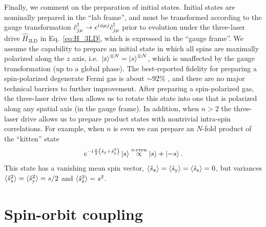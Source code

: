 \documentclass[aps,pra,nofootinbib,twocolumn,superscriptaddress]{revtex4-2}
\renewcommand{\t}{\text} %
\newcommand{\p}[1]{\left(#1\right)} %
\newcommand{\bk}{\braket} %
\renewcommand{\i}{\mathrm{i}\mkern1mu} %
\newcommand{\1}{\mathds{1}}
\renewcommand{\c}{\hat{c}}
\newcommand{\s}{\hat{s}}
\renewcommand{\H}{\hat{H}}
\newcommand{\x}{\text{x}}
\newcommand{\y}{\text{y}}
\newcommand{\z}{\text{z}}
\begin{document}
Finally, we comment on the preparation of initial states.
Initial states are nominally prepared in the ``lab frame'', and must be transformed according to the gauge transformation $\c_{j\mu}^\dag\to e^{\i\phi\mu j} \c_{j\mu}^\dag$ prior to evolution under the three-laser drive $\H_{\t{3LD}}$ in Eq.~\eqref{eq:H_3LD}, which is expressed in the ``gauge frame''.
We assume the capability to prepare an initial state in which all spins are maximally polarized along the $z$ axis, i.e.~$\ket{\z}^{\otimes N}=\ket{s}^{\otimes N}$, which is unaffected by the gauge transformation (up to a global phase).
The best-reported fidelity for preparing a spin-polarized degenerate Fermi gas is about $\sim92\%$ \cite{sonderhouse2020thermodynamics}, and there are no major technical barriers to further improvement.
After preparing a spin-polarized gas, the three-laser drive then allows us to rotate this state into one that is polarized along any spatial axis (in the gauge frame).
In addition, when $n>2$ the three-laser drive allows us to prepare product states with nontrivial intra-spin correlations.
For example, when $n$ is even we can prepare an $N$-fold product of the ``kitten'' state
\begin{align}
  e^{-\i\frac{\pi}{2}\p{\s_\y + \s_\y^2}} \ket{s}
  \stackrel{n\,\t{even}}{\propto} \ket{s} + \ket{-s}.
\end{align}
This state has a vanishing mean spin vector, $\bk{\s_\x}=\bk{\s_\y}=\bk{\s_\z}=0$, but variances $\bk{\s_\x^2}=\bk{\s_\y^2}=s/2$ and $\bk{\s_\z^2}=s^2$.

\section{Spin-orbit coupling}
\label{sec:SOC}
\end{document}
